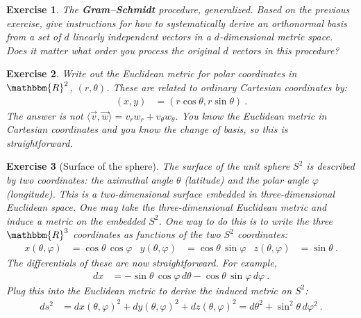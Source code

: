 \documentclass[
  11pt,
	colorful,
	raggedright,
]{tufte-style-thesis-flip}
\newtheorem{exercise}{Exercise}[section]
\begin{document}
\begin{exercise} The \textbf{Gram--Schmidt} procedure, generalized.
Based on the previous exercise, give instructions for how to systematically derive an orthonormal basis from a set of $d$ linearly independent vectors in a $d$-dimensional metric space. Does it matter what order you process the original $d$ vectors in this procedure?
\end{exercise}


\begin{exercise}\label{ex:polar:coordinates} Write out the Euclidean metric for polar coordinates in $\mathbbm{R}^2$, $(r,\theta)$. These are related to ordinary Cartesian coordinates by:
\begin{align}
  (x,y) &= (r\cos\theta, r\sin\theta) \ .
\end{align}
The answer is \emph{not} $\langle \vec{v},\vec{w}\rangle = v_rw_r + v_\theta w_\theta$. You know the Euclidean metric in Cartesian coordinates and you know the change of basis, so this is straightforward. 
\end{exercise}

\begin{exercise}[Surface of the sphere]
The surface of the unit sphere $S^2$ is described by two coordinates: the azimuthal angle $\theta$ (latitude) and the polar angle $\varphi$ (longitude). This is a two-dimensional surface \emph{embedded} in three-dimensional Euclidean space. One may take the three-dimensional Euclidean metric and induce a metric on the embedded $S^2$. One way to do this is to write the three $\mathbbm{R}^3$ coordinates as functions of the two $S^2$ coordinates:
\begin{align}
  x(\theta,\varphi)
  &=
  \cos\theta\,\cos\varphi
  &
  y(\theta,\varphi)
  &=
  \cos\theta\,\sin\varphi
  &
  z(\theta,\varphi)
  &=
  \sin\theta
  \ .
\end{align}
The differentials of these are now straightforward. For example,
\begin{align}
  dx & = 
  -\sin\theta\,\cos\varphi \,d\theta
  -\cos\theta\, \sin\varphi\, d\varphi \ .
\end{align}
Plug this into the Euclidean metric to derive the induced metric on $S^2$:
\begin{align}
  ds^2 
  &= 
  dx(\theta,\varphi)^2 + dy(\theta,\varphi)^2 + dz(\theta,\varphi)^2
  =
  d\theta^2 + \sin^2\theta\, d\varphi^2 \ .
  \label{eq:S2:metric}
\end{align}
\end{exercise}
\end{document}
